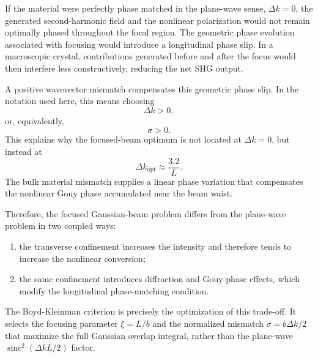 \begin{resolucao}[Solution]
        If the material were perfectly phase matched in the plane-wave sense, $\Delta k=0$, the generated second-harmonic field and the nonlinear polarization would not remain optimally phased throughout the focal region. The geometric phase evolution associated with focusing would introduce a longitudinal phase slip. In a macroscopic crystal, contributions generated before and after the focus would then interfere less constructively, reducing the net SHG output.

        A positive wavevector mismatch compensates this geometric phase slip. In the notation used here, this means choosing
        \begin{equation}
            \Delta k>0,
        \end{equation}
        or, equivalently,
        \begin{equation}
            \sigma>0.
        \end{equation}
        This explains why the focused-beam optimum is not located at $\Delta k=0$, but instead at
        \begin{equation}
            \Delta k_{\mathrm{opt}}\approx \frac{3.2}{L}.
        \end{equation}
        The bulk material mismatch supplies a linear phase variation that compensates the nonlinear Gouy phase accumulated near the beam waist.

        Therefore, the focused Gaussian-beam problem differs from the plane-wave problem in two coupled ways:
        \begin{enumerate}
            \item the transverse confinement increases the intensity and therefore tends to increase the nonlinear conversion;
            \item the same confinement introduces diffraction and Gouy-phase effects, which modify the longitudinal phase-matching condition.
        \end{enumerate}
        The Boyd-Kleinman criterion is precisely the optimization of this trade-off. It selects the focusing parameter $\xi=L/b$ and the normalized mismatch $\sigma=b\Delta k/2$ that maximize the full Gaussian overlap integral, rather than the plane-wave $\operatorname{sinc}^2(\Delta kL/2)$ factor.

\end{resolucao}
